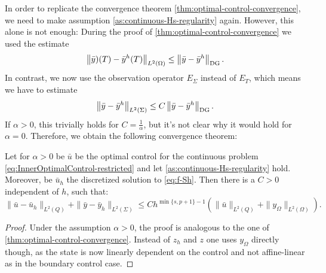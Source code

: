 \documentclass[../thesis.tex]{subfiles}
\begin{document}
In order to replicate the convergence theorem \cref{thm:optimal-control-convergence}, we need to make assumption \cref{as:continuous-Hs-regularity} again.
However, this alone is not enough: During the proof of \cref{thm:optimal-control-convergence} we used the estimate
\[
	\left\| \bar{y})(T) - \bar{y}^h(T) \right\|_{L^2(\Omega)} \leq \left\| \bar{y} - \bar{y}^h \right\|_{\mathrm{DG}}.
\]
In contrast, we now use the observation operator $E_\Sigma$ instead of $E_T$, which means we have to estimate
\[
	\left\| \bar{y} - \bar{y}^h \right\|_{L^2(\Sigma)} \leq C \left\| \bar{y} - \bar{y}^h \right\|_{\mathrm{DG}}.
\]
If $\alpha > 0$, this trivially holds for $C = \frac{1}{\alpha}$, but it's not clear why it would hold for $\alpha = 0$. Therefore, we obtain the following convergence theorem:
\begin{theorem}
Let for $\alpha > 0$ be $\bar{u}$ be the optimal control for the continuous problem \cref{eq:InnerOptimalControl-restricted} and let \cref{as:continuous-Hs-regularity} hold. Moreover, be $\bar{u}_h$ the discretized solution to \cref{eq:f-Sh}.
Then there is a $C > 0$ independent of $h$, such that:
\[
	\| \bar{u} - \bar{u}_h \|_{L^2(Q)} + \| \bar{y} - \bar{y}_h \|_{L^2(\Sigma)} \leq C h^{\min \{ s, p+1\} - 1} \left( \| \bar{u} \|_{L^2(Q)} + \| y_\Omega \|_{L^2(\Omega)} \right).
\]
\end{theorem}
\begin{proof}
Under the assumption $\alpha > 0$, the proof is analogous to the one of \cref{thm:optimal-control-convergence}. Instead of $z_h$ and $z$ one uses $y_\Omega$ directly though, as the state is now linearly dependent on the control and not affine-linear as in the boundary control case.
\end{proof}
\end{document}
